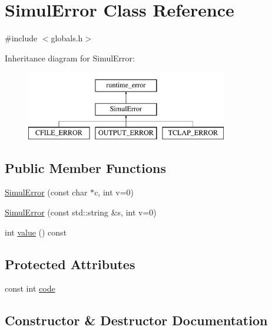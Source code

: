 \hypertarget{classSimulError}{}\section{Simul\+Error Class Reference}
\label{classSimulError}


{\ttfamily \#include $<$globals.\+h$>$}

Inheritance diagram for Simul\+Error\+:\begin{figure}[H]
\begin{center}
\leavevmode
\includegraphics[height=3.000000cm]{classSimulError}
\end{center}
\end{figure}
\subsection*{Public Member Functions}
\begin{DoxyCompactItemize}
\item 
\hyperlink{classSimulError_afaa5c6167e80c55fb3814c1bbcb7dcb9}{Simul\+Error} (const char $\ast$c, int v=0)
\item 
\hyperlink{classSimulError_a475bd5eab2cafd9c6b72471449dc2576}{Simul\+Error} (const std\+::string \&s, int v=0)
\item 
int \hyperlink{classSimulError_a34627c973b586c593d8ed0f7352bc401}{value} () const
\end{DoxyCompactItemize}
\subsection*{Protected Attributes}
\begin{DoxyCompactItemize}
\item 
const int \hyperlink{classSimulError_a5cd98a7eddc7982f5c715ef1c76a1bc2}{code}
\end{DoxyCompactItemize}


\subsection{Constructor \& Destructor Documentation}
\mbox{\label{classSimulError_afaa5c6167e80c55fb3814c1bbcb7dcb9}} 
